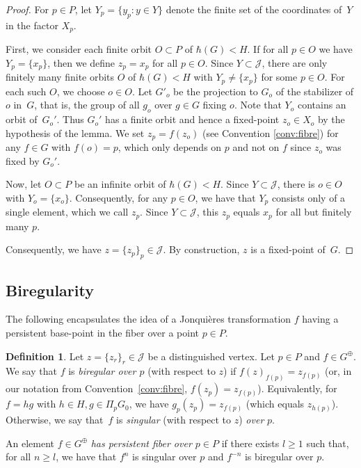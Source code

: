 \documentclass[JEP,XML,SOM,Unicode, NoEqCountersInSection,published]{cedram}
\newcommand{\Jon}{\mathscr{J}}
\theoremstyle{plain}
\theoremstyle{definition}
\newtheorem{definition}[theorem]{Definition}
\begin{document}
\begin{proof}
{
For $p\in P$, let $Y_p=\{y_p \colon y\in Y\}$ denote the finite set of the coordinates of~$Y$ in the factor $X_p$.}

{First, we consider each finite orbit $O\subset P$ of $\hbar(G)<H$. If for all $p\in O$ we have $Y_p=\{x_p\}$, then we define $z_p=x_p$ for all $p\in O$.
Since $Y\subset \Jon$, there are only finitely many finite orbits $O$ of $\hbar(G)<H$ with $Y_p\neq \{x_p\}$ for some $p\in O$. For each such $O$, we choose $o\in O$. Let $G'_o$ be the projection to $G_o$ of the stabilizer of $o$ in~$G$, that is, the group of all $g_o$ over $g\in G$ fixing $o$. Note that $Y_o$ contains an orbit of~$G_o'$. Thus $G_o'$ has a finite orbit and hence a fixed-point $z_o\in X_o$ by the hypothesis of the lemma. We set $z_p=f(z_o)$ (see Convention \ref{conv:fibre}) for any $f\in G$ with $f(o)=p$, which only depends on $p$ and not on $f$ since $z_o$ was fixed by $G_o'$. }

{Now, let $O\subset P$ be an infinite orbit of $\hbar(G)<H$. Since $Y\subset \Jon$, there is $o\in O$ with $Y_o=\{x_o\}$. Consequently, for any $p\in O$, we have that $Y_p$ consists only of a single element, which we call $z_p$.
Since $Y\subset \Jon$, this $z_p$ equals $x_p$ for all but finitely many $p$.}

{Consequently, we have $z=\{z_p\}_p\in \Jon$. By construction, $z$ is a fixed-point of~$G$.}
\end{proof}

\subsection{Biregularity}

The following encapsulates the idea of a Jonquières transformation $f$ having a persistent base-point in the fiber over a point $p\in P$.

\begin{definition}
\label{def:pers} Let $z=\{z_r\}_r\in \Jon$ be a distinguished vertex. Let $p\in P$ and $f\in G^\oplus$. We say that $f$ is \emph{biregular over $p$} (with respect to $z$) if $f(z)_{f(p)}=z_{f(p)}$ (or, in our notation from Convention~\ref{conv:fibre}, $f(z_p)=z_{f(p)}$). Equivalently, for $f=hg$ with $h\in H, g\in \Pi_pG_0$, we have $g_p(z_p)=z_{f(p)}$ (which equals $z_{h(p)}$). Otherwise, we say that~$f$ is \emph{singular} (with respect to $z$) \emph{over} $p$.

An element $f\in G^\oplus$ \emph{has persistent fiber over $p\in P$} if there exists $l\geq 1$ such that, for all $n\geq l$, we have that $f^n$ is singular over $p$ and $f^{-n}$ is biregular over $p$.
\end{definition}
\end{document}
